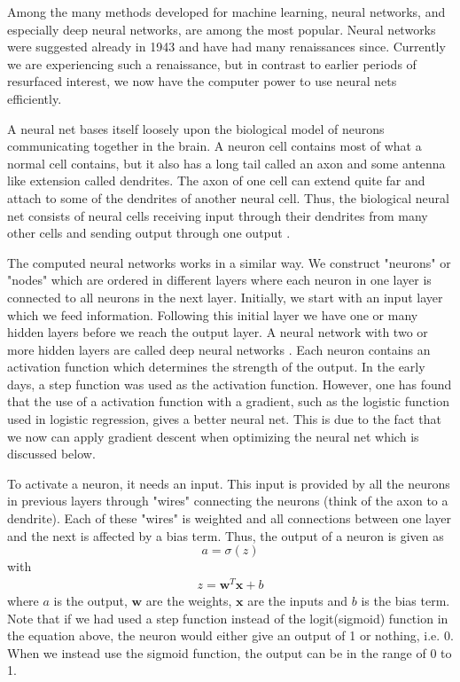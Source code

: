Among the many methods developed for machine learning, neural networks, and especially deep neural networks, are among the most popular. Neural networks were suggested already in 1943 \cite{McCulloch1943} and have had many renaissances since. Currently we are experiencing such a renaissance, but in contrast to earlier periods of resurfaced interest, we now have the computer power to use neural nets efficiently.

A neural net bases itself loosely upon the biological model of neurons communicating together in the brain. A neuron cell contains most of what a normal cell contains, but it also has a long tail called an axon and some antenna like extension called dendrites. The axon of one cell can extend quite far and attach to some of the dendrites of another neural cell. Thus, the biological neural net consists of neural cells receiving input through their dendrites from many other cells and sending output through one output \citep[p. 257]{Geron}.

The computed neural networks works in a similar way. We construct "neurons" or "nodes" which are ordered in different layers where each neuron in one layer is connected to all neurons in the next layer. Initially, we start with an input layer which we feed information. Following this initial layer we have one or many hidden layers before we reach the output layer. A neural network with two or more hidden layers are called deep neural networks \citep[p. 263]{Geron}. Each neuron contains an activation function which determines the strength of the output. In the early days, a step function was used as the activation function. However, one has found that the use of a activation function with a gradient, such as the logistic function used in logistic regression, gives a better neural net. This is due to the fact that we now can apply gradient descent when optimizing the neural net which is discussed below.

To activate a neuron, it needs an input. This input is provided by all the neurons in previous layers through "wires" connecting the neurons (think of the axon to a dendrite). Each of these "wires" is weighted and all connections between one layer and the next is affected by a bias term. Thus, the output of a neuron is given as \citep[p. 260]{Geron}
\begin{equation}
    a = \sigma(z)
    \label{eqT:activation}
\end{equation}
with
\begin{align}
    z = \bm{w}^T \bm{x} + b
\end{align}
where $a$ is the output, $\bm{w}$ are the weights, $\bm{x}$ are the inputs and $b$ is the bias term. Note that if we had used a step function instead of the logit(sigmoid) function in the equation above, the neuron would either give an output of 1 or nothing, i.e. 0. When we instead use the sigmoid function, the output can be in the range of 0 to 1.

